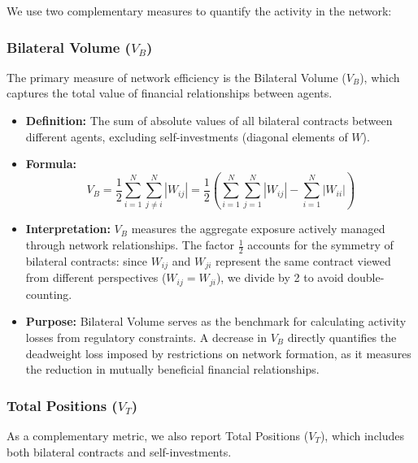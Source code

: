 We use two complementary measures to quantify the activity in the network:

\subsubsection{Bilateral Volume ($V_B$)}

The primary measure of network efficiency is the Bilateral Volume ($V_B$), which captures the total value of financial relationships between agents.

\begin{itemize}
    \item \textbf{Definition:} The sum of absolute values of all bilateral contracts between different agents, excluding self-investments (diagonal elements of $W$).
    
    \item \textbf{Formula:}
    $$V_B = \frac{1}{2} \sum_{i=1}^N \sum_{j \neq i}^N |W_{ij}| = \frac{1}{2} \left( \sum_{i=1}^N \sum_{j=1}^N |W_{ij}| - \sum_{i=1}^N |W_{ii}| \right)$$
    
    \item \textbf{Interpretation:} $V_B$ measures the aggregate exposure actively managed through network relationships. The factor $\frac{1}{2}$ accounts for the symmetry of bilateral contracts: since $W_{ij}$ and $W_{ji}$ represent the same contract viewed from different perspectives ($W_{ij}=W_{ji}$), we divide by 2 to avoid double-counting.
    
    \item \textbf{Purpose:} Bilateral Volume serves as the benchmark for calculating activity losses from regulatory constraints. A decrease in $V_B$ directly quantifies the deadweight loss imposed by restrictions on network formation, as it measures the reduction in mutually beneficial financial relationships.
\end{itemize}

\subsubsection{Total Positions ($V_T$)}

As a complementary metric, we also report Total Positions ($V_T$), which includes both bilateral contracts and self-investments.

